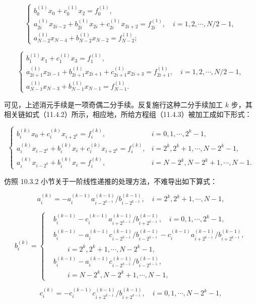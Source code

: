 \documentclass[
  10pt,
  fontset=fandol]{ctexart}
\begin{document}
\[
\begin{cases}
b_0^{(1)}x_0+c_0^{(1)}x_2=f_0^{(1)},\\
a_{2i}^{(1)}x_{2i-2}+b_{2i}^{(1)}x_{2i}+c_{2i}^{(1)}x_{2i+2}=f_{2i}^{(1)},\quad i=1,2,\cdots,N/2-1,\\
a_{N-2}^{(1)}x_{N-4}+b_{N-2}^{(1)}x_{N-2}=f_{N-2}^{(1)};
\end{cases}
\]

\[
\begin{cases}
b_1^{(1)}x_1+c_1^{(1)}x_3=f_1^{(1)},\\
a_{2i+1}^{(1)}x_{2i-1}+b_{2i+1}^{(1)}x_{2i+1}+c_{2i+1}^{(1)}x_{2i+3}=f_{2i+1}^{(1)},\quad i=1,2,\cdots,N/2-1,\\
a_{N-1}^{(1)}x_{N-3}+b_{N-1}^{(1)}x_{N-1}=f_{N-1}^{(1)}.
\end{cases}
\]

可见，上述消元手续是一项奇偶二分手续。反复施行这种二分手续加工 \(k\) 步，其相关链如式（11.4.2）所示，相应地，所给方程组（11.4.3）被加工成如下形式：

\[
\begin{cases}
b_i^{(k)}x_0+c_i^{(k)}x_{i+2^k}=f_i^{(k)},& i=0,1,\cdots,2^k-1,\\
a_i^{(k)}x_{i-2^k}+b_i^{(k)}x_i+c_i^{(k)}x_{i+2^k}=f_i^{(k)},& i=2^k,2^k+1,\cdots,N-2^k-1,\\
a_i^{(k)}x_{i-2^k}+b_i^{(k)}x_i=f_i^{(k)},& i=N-2^k,N-2^k+1,\cdots,N-1.
\end{cases}
\]

仿照 10.3.2 小节关于一阶线性递推的处理方法，不难导出如下算式：

\[
a_i^{(k)}=-a_i^{(k-1)}a_{i-2^{k-1}}^{(k-1)}/b_{i-2^{k-1}}^{(k-1)},\quad i=2^k,2^k+1,\cdots,N-1,
\]

\[
b_i^{(k)}=
\left\{
\begin{aligned}
&b_i^{(k-1)}-c_i^{(k-1)}a_{i+2^{k-1}}^{(k-1)}/b_{i+2^{k-1}}^{(k-1)},\quad i=0,1,\cdots,2^k-1,\\
&b_i^{(k-1)}-a_i^{(k-1)}c_{i-2^{k-1}}^{(k-1)}/b_{i-2^{k-1}}^{(k-1)}-c_i^{(k-1)}a_{i+2^{k-1}}^{(k-1)}/b_{i+2^{k-1}}^{(k-1)},\\
&\qquad i=2^k,2^k+1,\cdots,N-2^k-1,\\
&b_i^{(k-1)}-a_i^{(k-1)}c_{i-2^{k-1}}^{(k-1)}/b_{i-2^{k-1}}^{(k-1)},\\
&\qquad i=N-2^k,N-2^k+1,\cdots,N-1,
\end{aligned}
\right.
\]

\[
c_i^{(k)}=-c_i^{(k-1)}c_{i+2^{k-1}}^{(k-1)}/b_{i+2^{k-1}}^{(k-1)},\quad i=0,1,\cdots,N-2^k-1,
\]
\end{document}
